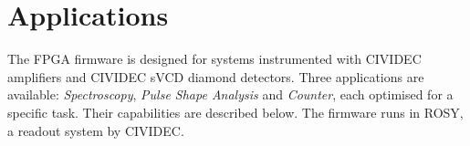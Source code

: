 \documentclass[12pt]{packages/mytustyle}  %
\begin{document}


\clearpage
\section{Applications}
\label{sec:applications}

The FPGA firmware is designed for systems instrumented with CIVIDEC amplifiers and CIVIDEC sVCD diamond detectors. Three applications are available: \emph{Spectroscopy}, \emph{Pulse Shape Analysis} and \emph{Counter}, each optimised for a specific task. Their capabilities are described below. The firmware runs in ROSY, a readout system by CIVIDEC.
\end{document}
